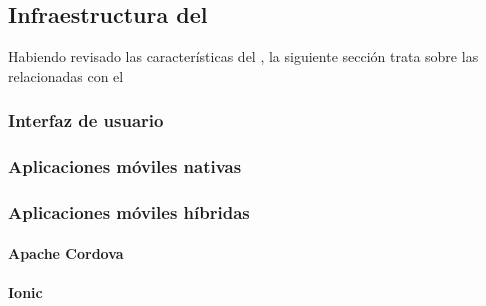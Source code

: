 \subsection{Infraestructura del }
\label{interfaz_usuario}

Habiendo revisado las características del , la siguiente sección trata sobre las relacionadas con el 

\subsubsection{Interfaz de usuario}
\label{interfaz_usuario}

\subsubsection{Aplicaciones móviles nativas}
\label{apps_nativas}

\subsubsection{Aplicaciones móviles híbridas}
\label{apps_hibirdas}

\paragraph{Apache Cordova}
\label{cordova}

\paragraph{Ionic}
\label{ionic}